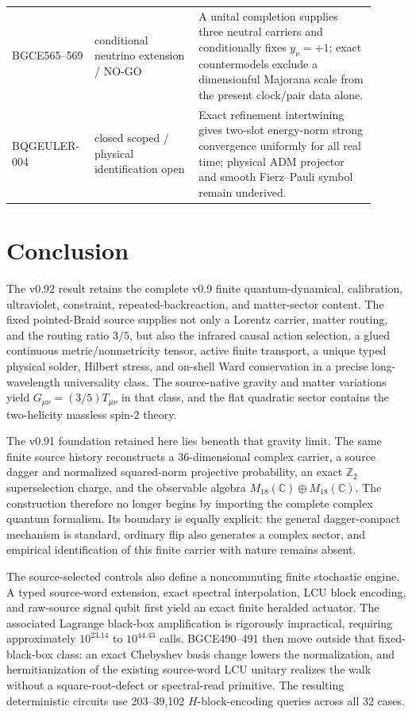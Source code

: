 \documentclass[11pt]{article}
\theoremstyle{definition}
\theoremstyle{remark}
\begin{document}
\begin{longtable}{>{\raggedright\arraybackslash}p{0.18\linewidth} >{\raggedright\arraybackslash}p{0.27\linewidth} >{\raggedright\arraybackslash}p{0.46\linewidth}}
BGCE565--569 & conditional neutrino extension / NO-GO & A unital completion supplies three neutral carriers and conditionally fixes $y_\nu=+1$; exact countermodels exclude a dimensionful Majorana scale from the present clock/pair data alone. \\
BQGEULER-004 & closed scoped / physical identification open & Exact refinement intertwining gives two-slot energy-norm strong convergence uniformly for all real time; physical ADM projector and smooth Fierz--Pauli symbol remain underived. \\
\bottomrule
\end{longtable}

\section{Conclusion}

The v0.92 result retains the complete v0.9 finite quantum-dynamical, calibration, ultraviolet, constraint, repeated-backreaction, and matter-sector content. The fixed pointed-Braid source supplies not only a Lorentz carrier, matter routing, and the routing ratio $3/5$, but also the infrared causal action selection, a glued continuous metric/nonmetricity tensor, active finite transport, a unique typed physical solder, Hilbert stress, and on-shell Ward conservation in a precise long-wavelength universality class. The source-native gravity and matter variations yield $G_{\mu\nu}=(3/5)T_{\mu\nu}$ in that class, and the flat quadratic sector contains the two-helicity massless spin-2 theory.

The v0.91 foundation retained here lies beneath that gravity limit. The same finite source history reconstructs a 36-dimensional complex carrier, a source dagger and normalized squared-norm projective probability, an exact $\mathbb Z_2$ superselection charge, and the observable algebra $M_{18}(\mathbb C)\oplus M_{18}(\mathbb C)$. The construction therefore no longer begins by importing the complete complex quantum formalism. Its boundary is equally explicit: the general dagger-compact mechanism is standard, ordinary flip also generates a complex sector, and empirical identification of this finite carrier with nature remains absent.

The source-selected controls also define a noncommuting finite stochastic engine. A typed source-word extension, exact spectral interpolation, LCU block encoding, and raw-source signal qubit first yield an exact finite heralded actuator. The associated Lagrange black-box amplification is rigorously impractical, requiring approximately $10^{23.14}$ to $10^{44.43}$ calls. BGCE490--491 then move outside that fixed-black-box class: an exact Chebyshev basis change lowers the normalization, and hermitianization of the existing source-word LCU unitary realizes the walk without a square-root-defect or spectral-read primitive. The resulting deterministic circuits use 203--39,102 $H$-block-encoding queries across all 32 cases.
\end{document}
